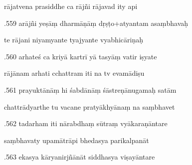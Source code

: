 \documentclass[article,12pt,a4paper]{memoir}%
\newcounter{parCount}
\begin{document}
	  
	  \pstart \leavevmode%
	rājatvena prasiddhe ca rājñi rājavad ity api 
	{}
	\pend%
      

	  
	  \pstart {}.559 arājñi yeṣāṃ dharmāṇāṃ dṛṣṭo+atyantam asaṃbhavaḥ 
	{}
	\pend%
      

	  
	  \pstart \leavevmode%
	te rājani niyamyante tyajyante vyabhicāriṇaḥ 
	{}
	\pend%
      

	  
	  \pstart {}.560 arhateś ca kriyā kartrī yā tasyāṃ vatir iṣyate 
	{}
	\pend%
      

	  
	  \pstart \leavevmode%
	rājānam arhati cchattram iti na tv evamādiṣu 
	{}
	\pend%
      

	  
	  \pstart {}.561 prayuktānāṃ hi śabdānāṃ śāstreṇānugamaḥ satām 
	{}
	\pend%
      

	  
	  \pstart \leavevmode%
	chattrādyarthe tu vacane pratyākhyānaṃ na saṃbhavet 
	{}
	\pend%
      

	  
	  \pstart {}.562 tadarham iti nārabdhaṃ sūtraṃ vyākaraṇāntare 
	{}
	\pend%
      

	  
	  \pstart \leavevmode%
	saṃbhavaty upamātrāpi bhedasya parikalpanāt 
	{}
	\pend%
      

	  
	  \pstart {}.563 ekasya kāryanirjñānāt siddhasya viṣayāntare 
	{}
	\pend%
      
\end{document}
